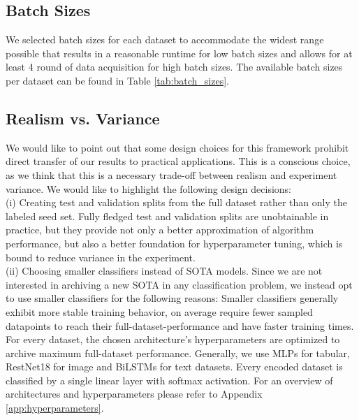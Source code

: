 \documentclass[]{article}
\begin{document}
\subsection{Batch Sizes}\label{sec:batch_sizes}
We selected batch sizes for each dataset to accommodate the widest range possible that results in a reasonable runtime for low batch sizes and allows for at least 4 round of data acquisition for high batch sizes.
The available batch sizes per dataset can be found in Table \ref{tab:batch_sizes}.

\subsection{Realism vs. Variance}\label{sec:realism}
We would like to point out that some design choices for this framework prohibit direct transfer of our results to practical applications. 
This is a conscious choice, as we think that this is a necessary trade-off between realism and experiment variance.
We would like to highlight the following design decisions: \\
(i) Creating test and validation splits from the full dataset rather than only the labeled seed set. Fully fledged test and validation splits are unobtainable in practice, but they provide not only a better approximation of algorithm performance, but also a better foundation for hyperparameter tuning, which is bound to reduce variance in the experiment. \\
(ii) Choosing smaller classifiers instead of SOTA models. Since we are not interested in archiving a new SOTA in any classification problem, we instead opt to use smaller classifiers for the following reasons:
Smaller classifiers generally exhibit more stable training behavior, on average require fewer sampled datapoints to reach their full-dataset-performance and have faster training times.
For every dataset, the chosen architecture's hyperparameters are optimized to archive maximum full-dataset performance.
Generally, we use MLPs for tabular, RestNet18 for image and BiLSTMs for text datasets.
Every encoded dataset is classified by a single linear layer with softmax activation.
For an overview of architectures and hyperparameters please refer to Appendix \ref{app:hyperparameters}. \\


\end{document}
